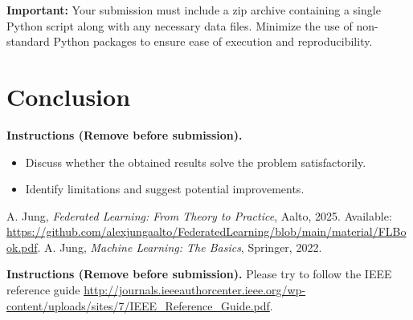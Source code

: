 \documentclass[9pt]{article}
\begin{document}
\textbf{Important:} Your submission must include a zip archive containing a single 
Python script along with any necessary data files. Minimize the use of non-standard 
Python packages to ensure ease of execution and reproducibility.

	
	\section{Conclusion}
	\label{sec:conclusion}
	{\bf Instructions (Remove before submission).}
		\begin{itemize}
			\item Discuss whether the obtained results solve the problem satisfactorily.
			\item Identify limitations and suggest potential improvements.
		\end{itemize}
	
	\begin{thebibliography}{9}
		 A. Jung, \textit{Federated Learning: From Theory to Practice}, Aalto, 2025. Available: \url{https://github.com/alexjungaalto/FederatedLearning/blob/main/material/FLBook.pdf}.
		 A. Jung, \textit{Machine Learning: The Basics}, Springer, 2022.
	\end{thebibliography}
	{\bf Instructions (Remove before submission).} Please try to follow the IEEE reference guide \url{http://journals.ieeeauthorcenter.ieee.org/wp-content/uploads/sites/7/IEEE_Reference_Guide.pdf}.
	
\end{document}
